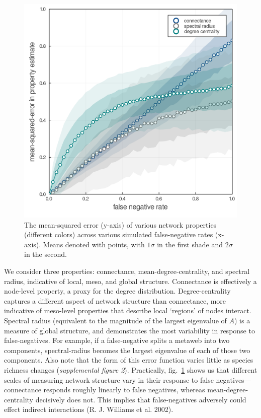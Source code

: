 \documentclass[10pt,oneside]{article}
\makeatletter
\def\maxwidth{\ifdim\Gin@nat@width>\linewidth\linewidth
\else\Gin@nat@width\fi}
\let\Oldincludegraphics\includegraphics
\renewcommand{\includegraphics}[1]{\Oldincludegraphics[width=\maxwidth]{#1}}
\makeatother
\begin{document}
\begin{figure}
\hypertarget{fig:properties}{%
\centering
\includegraphics{./figures/props_specrad.png}
\caption{The mean-squared error (y-axis) of various network properties
(different colors) across various simulated false-negative rates
(x-axis). Means denoted with points, with \(1\sigma\) in the first shade
and \(2\sigma\) in the second.}\label{fig:properties}
}
\end{figure}

We consider three properties: connectance, mean-degree-centrality, and
spectral radius, indicative of local, meso, and global structure.
Connectance is effectively a node-level property, a proxy for the degree
distribution. Degree-centrality captures a different aspect of network
structure than connectance, more indicative of meso-level properties
that describe local `regions' of nodes interact. Spectral radius
(equivalent to the magnitude of the largest eigenvalue of \(A\)) is a
measure of global structure, and demonstrates the most variability in
response to false-negatives. For example, if a false-negative splits a
metaweb into two components, spectral-radius becomes the largest
eigenvalue of each of those two components. Also note that the form of
this error function varies little as species richness changes
(\emph{supplemental figure 2}). Practically, fig.~\ref{fig:properties}
shows us that different scales of measuring network structure vary in
their response to false negatives---connectance responds roughly
linearly to false negatives, whereas mean-degree-centrality decisively
does not. This implies that false-negatives adversely could effect
indirect interactions (R. J. Williams et al. 2002).
\end{document}
